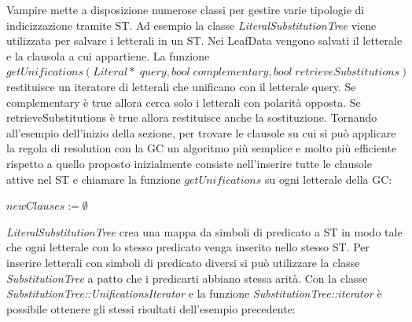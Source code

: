 \documentclass[./main.tex]{subfiles}
\begin{document}
Vampire mette a disposizione numerose classi per gestire varie tipologie di indicizzazione tramite ST.
Ad esempio la classe \textit{LiteralSubstitutionTree} viene utilizzata per salvare i letterali in un ST.
Nei LeafData vengono salvati il letterale e la clausola a cui appartiene.
La funzione $getUnifications(Literal*\; query, bool\; complementary, bool\; retrieveSubstitutions)$ 
restituisce un iteratore di 
letterali che unificano con il letterale query. Se complementary è true allora cerca solo i letterali con polarità opposta.
Se retrieveSubstitutions è true allora restituisce anche la sostituzione.
Tornando all'esempio dell'inizio della sezione, per trovare le clausole su cui si può applicare la regola di resolution
con la GC un algoritmo più semplice e molto più efficiente rispetto a quello proposto inizialmente
consiste nell'inserire tutte le clausole attive nel ST e
chiamare la funzione $getUnifications$ su ogni letterale della GC:

$newClauses := \emptyset$\;\\


\textit{LiteralSubstitutionTree} crea una mappa da simboli di predicato a ST in modo tale che ogni letterale 
con lo stesso predicato venga inserito nello stesso ST. 
Per inserire letterali con simboli di predicato diversi si può utilizzare la classe \textit{SubstitutionTree} a patto 
che i predicarti abbiano stessa arità. Con la classe \textit{SubstitutionTree::UnificationsIterator} e 
la funzione \textit{SubstitutionTree::iterator} è possibile ottenere gli stessi risultati dell'esempio precedente:
\end{document}
